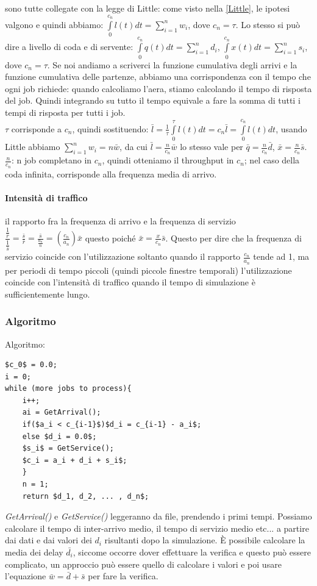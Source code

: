 \documentclass{article}
\begin{document}
sono tutte collegate con la legge di Little: come visto nella \ref{Little}, le ipotesi valgono e quindi abbiamo: $\int\limits_{0}^{c_n} l(t) dt = \sum\limits_{i=1}^{n} w_i$, dove $c_n = \tau$. Lo stesso si può dire a livello di coda e di servente: $\int\limits_{0}^{c_n} q(t) dt = \sum\limits_{i=1}^{n} d_i$, $\int\limits_{0}^{c_n} x(t) dt = \sum\limits_{i=1}^{n} s_i$, dove $c_n = \tau$. Se noi andiamo a scriverci la funzione cumulativa degli arrivi e la funzione cumulativa delle partenze, abbiamo una corrispondenza con il tempo che ogni job richiede: quando calcoliamo l'aera, stiamo calcolando il tempo di risposta del job. Quindi integrando su tutto il tempo equivale a fare la somma di tutti i tempi di risposta per tutti i job.\\ $\tau$ corrisponde a $c_n$, quindi sostituendo: $\bar{l} = \frac{1}{\tau} \int\limits_{0}^{\tau} l(t) dt = c_n \bar{l} = \int\limits_{0}^{c_n} l(t) dt$, usando Little abbiamo $\sum\limits_{i=1}^{n} w_i = n \bar{w}$, da cui $\bar{l} = \frac{n}{c_n} \bar{w}$ lo stesso vale per $\bar{q} = \frac{n}{c_n} \bar{d}$, $\bar{x} = \frac{n}{c_n} \bar{s}$.\\$\frac{n}{c_n}$: n job completano in $c_n$, quindi otteniamo il throughput in $c_n$; nel caso della coda infinita, corrisponde alla frequenza media di arrivo.
\paragraph{Intensità di traffico}il rapporto fra la frequenza di arrivo e la frequenza di servizio $\dfrac{\frac{1}{\bar{r}}}{\frac{1}{\bar{s}}} = \frac{\bar{s}}{\bar{r}} = \frac{\bar{s}}{\frac{a_n}{n}} = (\frac{c_n}{a_n})\bar{x}$ questo poiché $\bar{x} = \frac{x}{c_n}\bar{s}$. Questo per dire che la frequenza di servizio coincide con l'utilizzazione soltanto quando il rapporto $\frac{c_n}{a_n}$ tende ad 1, ma per periodi di tempo piccoli (quindi piccole finestre temporali) l'utilizzazione coincide con l'intensità di traffico quando il tempo di simulazione è sufficientemente lungo.
\subsubsection{Algoritmo}
Algoritmo:
\lstset{
	mathescape
}
\begin{lstlisting} 
$c_0$ = 0.0;
i = 0;
while (more jobs to process){
	i++;
	ai = GetArrival();
	if($a_i < c_{i-1}$)$d_i = c_{i-1} - a_i$;
	else $d_i = 0.0$;
	$s_i$ = GetService();
	$c_i = a_i + d_i + s_i$;
	}
	n = 1;
	return $d_1, d_2, ... , d_n$;
\end{lstlisting}
\textit{GetArrival()} e \textit{GetService()} leggeranno da file, prendendo i primi tempi. Possiamo calcolare il tempo di inter-arrivo medio, il tempo di servizio medio etc... a partire dai dati e dai valori dei $d_i$ risultanti dopo la simulazione. È possibile calcolare la media dei delay $\bar{d_i}$, siccome occorre dover effettuare la verifica e questo può essere complicato, un approccio può essere quello di calcolare i valori e poi usare l'equazione $\bar{w} = \bar{d} + \bar{s}$ per fare la verifica.
\end{document}

